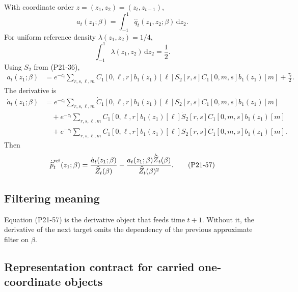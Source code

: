 \documentclass[11pt]{article}
\newcommand{\dd}{\,\mathrm d}
\newcommand{\widehatZ}{\widehat Z}
\newcommand{\widehatq}{\widehat q}
\newcommand{\widehatp}{\widehat p}
\begin{document}
With coordinate order \(z=(z_1,z_2)=(z_t,z_{t-1})\),
\[
    a_t(z_1;\beta)=\int_{-1}^{1}\widehatq_t(z_1,z_2;\beta)\dd z_2.
    \tag{P21-53}
\]
For uniform reference density \(\lambda(z_1,z_2)=1/4\),
\[
    \int_{-1}^{1}\lambda(z_1,z_2)\dd z_2=\frac12.
    \tag{P21-54}
\]
Using \(S_2\) from (P21-36),
\[
\begin{aligned}
    a_t(z_1;\beta)
    &=
    e^{-c_t}
    \sum_{r,s,\ell,m}
    C_1[0,\ell,r]b_1(z_1)[\ell]
    S_2[r,s]
    C_1[0,m,s]b_1(z_1)[m]
    +\frac{\tau_t}{2}.
\end{aligned}
    \tag{P21-55}
\]
The derivative is
\[
\begin{aligned}
    \dot a_t(z_1;\beta)
    &=
    e^{-c_t}
    \sum_{r,s,\ell,m}
    \dot C_1[0,\ell,r]b_1(z_1)[\ell]
    S_2[r,s]C_1[0,m,s]b_1(z_1)[m]\\
    &\quad+
    e^{-c_t}
    \sum_{r,s,\ell,m}
    C_1[0,\ell,r]b_1(z_1)[\ell]
    \dot S_2[r,s]C_1[0,m,s]b_1(z_1)[m]\\
    &\quad+
    e^{-c_t}
    \sum_{r,s,\ell,m}
    C_1[0,\ell,r]b_1(z_1)[\ell]
    S_2[r,s]\dot C_1[0,m,s]b_1(z_1)[m].
\end{aligned}
    \tag{P21-56}
\]
Then
\[
    \dot{\widehatp}^{\rm ref}_t(z_1;\beta)
    =
    \frac{\dot a_t(z_1;\beta)}{\widehatZ_t(\beta)}
    -
    \frac{a_t(z_1;\beta)\dot{\widehatZ}_t(\beta)}
    {\widehatZ_t(\beta)^2}.
    \tag{P21-57}
\]

\subsection*{Filtering meaning}

Equation (P21-57) is the derivative object that feeds time \(t+1\).  Without
it, the derivative of the next target omits the dependency of the previous
approximate filter on \(\beta\).

\subsection*{Representation contract for carried one-coordinate objects}
\end{document}
